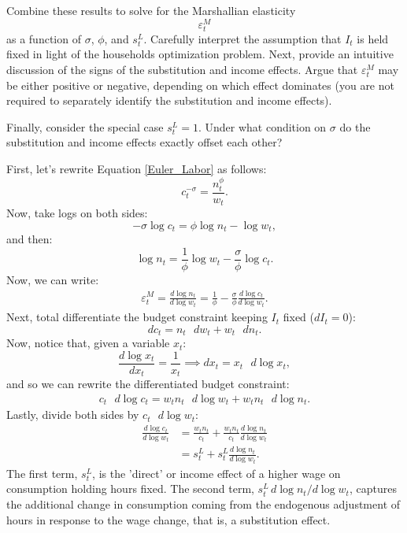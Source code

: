\documentclass[dvipsnames,11pt]{article}
\begin{document}
\begin{enumerate}
        Combine these results to solve for the Marshallian elasticity 
        \[
        \varepsilon_t^{M}
        \]
        as a function of $\sigma$, $\phi$, and $s_t^L$. Carefully interpret the assumption that $I_t$ is held fixed in light of the households optimization problem. Next, provide an intuitive discussion of the signs of the substitution and income effects. Argue that $\varepsilon_t^{M}$ may be either positive or negative, depending on which effect dominates (you are not required to separately identify the substitution and income effects).
        
        Finally, consider the special case $s_t^L = 1$. Under what condition on $\sigma$ do the substitution and income effects exactly offset each other?

        \begin{solution}

        First, let's rewrite Equation \eqref{Euler_Labor} as follows:
        \[
        c_t^{-\sigma} = \frac{n_t^\phi}{w_t}.
        \]
        Now, take logs on both sides:
        \[
        -\sigma \log c_t=\phi \log n_t-\log w_t,
        \]
        and then:
        \[
        \log n_t=\frac{1}{\phi} \log w_t-\frac{\sigma}{\phi} \log c_t.
        \]
        Now, we can write:
        \begin{align*}
            \varepsilon_t^M=\frac{d \log n_t}{d \log w_t}=\frac{1}{\phi}-\frac{\sigma}{\phi} \frac{d\log c_t}{d \log w_t}.
        \end{align*}
        Next, total differentiate the budget constraint keeping $I_t$ fixed ($dI_t=0$):
        \[
        d c_t=n_t \text{ }dw_t +  w_t \text{ } dn_t.
        \]
        Now, notice that, given a variable $x_t$:
        \[
        \frac{d \log x_t}{dx_t}=\frac{1}{x_t} \implies dx_t=x_t \text{ } d\log x_t,
        \]
        and so we can rewrite the differentiated budget constraint:
        \begin{align*}
            c_t \text{ } d\log c_t = w_t n_t \text{ } d \log w_t+ w_t n_t \text{ } d \log n_t.
        \end{align*}
        Lastly, divide both sides by $c_t \text{ } d \log w_t$:
        \begin{align*}
            \frac{d \log c_t}{d \log w_t}&=\frac{w_t n_t}{c_t}+\frac{w_tn_t}{c_t} \frac{d \log n_t}{d \log w_t} \\
            & = s_t^L+s_t^L\frac{d \log n_t}{d \log w_t}.
        \end{align*}
        The first term, $s_t^L$, is the 'direct' or income effect of a higher wage on consumption holding hours fixed. The second term, $s_t^L\, d\log n_t/d\log w_t$, captures the additional change in consumption coming from the endogenous adjustment of hours in response to the wage change, that is, a substitution effect.


\end{solution}
\end{enumerate}
\end{document}
